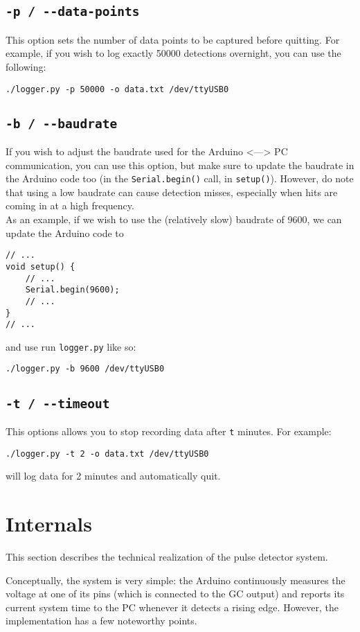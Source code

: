 \documentclass[11pt]{article}
\begin{document}
\subsection{\texttt{-p / -{}-data-points}}
\label{sec:orgae00dd6}
This option sets the number of data points to be captured before quitting. For example, if you wish to log exactly 50000 detections overnight, you can use the following:
\begin{verbatim}
./logger.py -p 50000 -o data.txt /dev/ttyUSB0
\end{verbatim}
\subsection{\texttt{-b / -{}-baudrate}}
\label{sec:orga99e952}
If you wish to adjust the baudrate used for the Arduino <---> PC communication, you can use this option, but make sure to update the baudrate in the Arduino code too (in the \texttt{Serial.begin()} call, in \texttt{setup()}). However, do note that using a low baudrate can cause detection misses, especially when hits are coming in at a high frequency.\\
As an example, if we wish to use the (relatively slow) baudrate of 9600, we can update the Arduino code to 
\begin{verbatim}
// ...
void setup() {
    // ...
    Serial.begin(9600);
    // ...
}
// ...
\end{verbatim}
and use run \texttt{logger.py} like so:
\begin{verbatim}
./logger.py -b 9600 /dev/ttyUSB0
\end{verbatim}
\subsection{\texttt{-t / -{}-timeout}}
\label{sec:org3472c71}
This options allows you to stop recording data after \texttt{t} minutes. For example:
\begin{verbatim}
./logger.py -t 2 -o data.txt /dev/ttyUSB0
\end{verbatim}
will log data for 2 minutes and automatically quit.

\section{Internals}
\label{sec:org427a174}
This section describes the technical realization of the pulse detector system.

Conceptually, the system is very simple: the Arduino continuously measures the voltage at one of its pins (which is connected to the GC output) and reports its current system time to the PC whenever it detects a rising edge. However, the implementation has a few noteworthy points.
\end{document}
